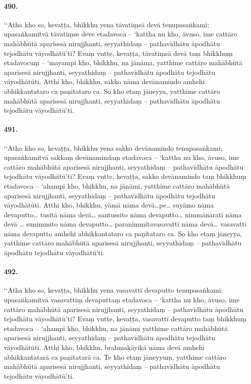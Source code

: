 \paragraph{490.} ‘‘Atha kho so, kevaṭṭa, bhikkhu yena tāvatiṃsā devā tenupasaṅkami; upasaṅkamitvā tāvatiṃse deve etadavoca – ‘kattha nu kho, āvuso, ime cattāro mahābhūtā aparisesā nirujjhanti, seyyathidaṃ – pathavīdhātu āpodhātu tejodhātu vāyodhātū’ti? Evaṃ vutte, kevaṭṭa, tāvatiṃsā devā taṃ bhikkhuṃ etadavocuṃ – ‘mayampi kho, bhikkhu, na jānāma, yatthime cattāro mahābhūtā aparisesā nirujjhanti, seyyathidaṃ – pathavīdhātu āpodhātu tejodhātu vāyodhātūti. Atthi kho, bhikkhu, sakko nāma devānamindo amhehi abhikkantataro ca paṇītataro ca. So kho etaṃ jāneyya, yatthime cattāro mahābhūtā aparisesā nirujjhanti, seyyathidaṃ – pathavīdhātu āpodhātu tejodhātu vāyodhātū’ti.

\paragraph{491.} ‘‘Atha kho so, kevaṭṭa, bhikkhu yena sakko devānamindo tenupasaṅkami; upasaṅkamitvā sakkaṃ devānamindaṃ etadavoca – ‘kattha nu kho, āvuso, ime cattāro mahābhūtā aparisesā nirujjhanti, seyyathidaṃ – pathavīdhātu āpodhātu tejodhātu vāyodhātū’ti? Evaṃ vutte, kevaṭṭa, sakko devānamindo taṃ bhikkhuṃ etadavoca – ‘ahampi kho, bhikkhu, na jānāmi, yatthime cattāro mahābhūtā aparisesā nirujjhanti, seyyathidaṃ – pathavīdhātu āpodhātu tejodhātu vāyodhātūti. Atthi kho, bhikkhu, yāmā nāma devā…pe… suyāmo nāma devaputto… tusitā nāma devā… santussito nāma devaputto… nimmānaratī nāma devā … sunimmito nāma devaputto… paranimmitavasavattī nāma devā… vasavattī nāma devaputto amhehi abhikkantataro ca paṇītataro ca. So kho etaṃ jāneyya, yatthime cattāro mahābhūtā aparisesā nirujjhanti, seyyathidaṃ – pathavīdhātu āpodhātu tejodhātu vāyodhātū’ti.

\paragraph{492.} ‘‘Atha kho so, kevaṭṭa, bhikkhu yena vasavattī devaputto tenupasaṅkami; upasaṅkamitvā vasavattiṃ devaputtaṃ etadavoca – ‘kattha nu kho, āvuso, ime cattāro mahābhūtā aparisesā nirujjhanti, seyyathidaṃ – pathavīdhātu āpodhātu tejodhātu vāyodhātū’ti? Evaṃ vutte, kevaṭṭa, vasavattī devaputto taṃ bhikkhuṃ etadavoca – ‘ahampi kho, bhikkhu, na jānāmi yatthime cattāro mahābhūtā aparisesā nirujjhanti, seyyathidaṃ – pathavīdhātu āpodhātu tejodhātu vāyodhātūti. Atthi kho, bhikkhu, brahmakāyikā nāma devā amhehi abhikkantatarā ca paṇītatarā ca. Te kho etaṃ jāneyyuṃ, yatthime cattāro mahābhūtā aparisesā nirujjhanti, seyyathidaṃ – pathavīdhātu āpodhātu tejodhātu vāyodhātū’ti.

